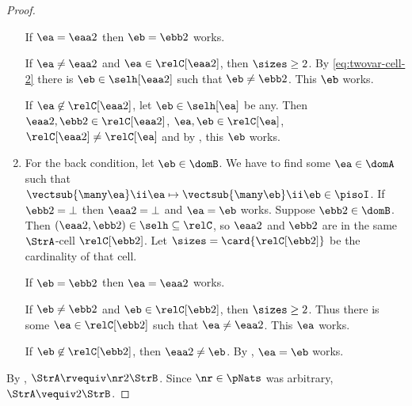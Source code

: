 \begin{proof}
\begin{enumerate}
  If $\ea = \eaa2$ then $\eb = \ebb2$ works.
 
  If $\ea \neq \eaa2$ and $\ea \in \relC[\eaa2]$, then $\sizes \geq 2$.
  By \cref{eq:twovar-cell-2} there is $\eb \in \selh[\eaa2]$ such that
  $\eb \neq \ebb2$. This $\eb$ works.

  If $\ea \not\in \relC[\eaa2]$, let $\eb \in \selh[\ea]$ be any.
  Then $\eaa2, \ebb2 \in \relC[\eaa2]$, $\ea, \eb \in \relC[\ea]$,
  $\relC[\eaa2] \neq \relC[\ea]$ and by ,
  this $\eb$ works.
  \item For the back condition, let $\eb \in \domB$.
  We have to find some $\ea \in \domA$ such that
  $\vectsub{\many\ea}\ii\ea \mapsto \vectsub{\many\eb}\ii\eb \in \pisoI$.
  If $\ebb2 = \bot$ then $\eaa2 = \bot$ and $\ea = \eb$ works.
  Suppose $\ebb2 \in \domB$. Then $(\eaa2,\ebb2) \in \selh \subseteq \relC$,
  so $\eaa2$ and $\ebb2$ are in the same $\StrA$-cell $\relC[\ebb2]$.
  Let $\sizes = \card{\relC[\ebb2]}$ be the cardinality of that cell.
  
  If $\eb = \ebb2$ then $\ea = \eaa2$ works.
  
  If $\eb \neq \ebb2$ and $\eb \in \relC[\ebb2]$, then $\sizes \geq 2$.
  Thus there is some $\ea \in \relC[\ebb2]$ such that $\ea \neq \eaa2$.
  This $\ea$ works.
  
  If $\eb \not\in \relC[\ebb2]$, then $\eaa2 \neq \eb$.
  By , $\ea = \eb$ works.
\end{enumerate}
By , $\StrA \rvequiv\nr2 \StrB$. Since $\nr \in \pNats$
was arbitrary, $\StrA \vequiv2 \StrB$.
\end{proof}